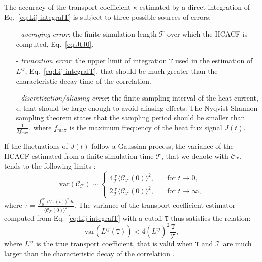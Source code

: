 \begin{LEtext}
The accuracy of the transport coefficient $\kappa$ estimated by a direct integration of Eq.~\eqref{eq:Lij-integralT} is subject to three possible sources of errors:
\begin{itemize}
    \item[-] \emph{averaging error}: the finite simulation length $\mathcal{T}$ over which the HCACF is computed, Eq.~\eqref{eq:JtJ0}.
    \item[-] \emph{truncation error}: the upper limit of integration $\mathtt{T}$ used in the estimation of $L^{ij}$, Eq.~\eqref{eq:Lij-integralT}, that should be much greater than the characteristic decay time of the correlation.
    \item[-] \emph{discretization/aliasing error}: the finite sampling interval of the heat current, $\epsilon$, that should be large enough to avoid aliasing effects. The Nyqvist-Shannon sampling theorem \cite{Oppenheim1999} states that the sampling period should be smaller than $\frac{1}{2f_\mathrm{max}}$, where $f_\mathrm{max}$ is the maximum frequency of the heat flux signal $J(t)$.
\end{itemize}
If the fluctuations of $J(t)$ follow a Gaussian process, the variance of the HCACF estimated from a finite simulation time $\mathcal{T}$, that we denote with $\mathcal{C}_\mathcal{T}$, tends to the following limits \cite{Jones2012}:
\begin{equation}
    \mathrm{var} \left(\mathcal{C}_\mathcal{T}\right) \sim \left\{
    \begin{aligned}
        4 \frac{\tilde\tau}{\mathcal{T}} \langle \mathcal{C}_\mathcal{T}(0) \rangle^2 , \quad &\text{for }t\rightarrow 0 , \\
        2 \frac{\tilde\tau}{\mathcal{T}} \langle \mathcal{C}_\mathcal{T}(0) \rangle^2 , \quad &\text{for }t\rightarrow \infty ,
    \end{aligned} \right.
\end{equation}
where $\tilde\tau = \frac{\int_0^\infty \langle \mathcal{C}_\mathcal{T}(t) \rangle^2 dt}{\langle \mathcal{C}_\mathcal{T}(0) \rangle^2}$. The variance of the transport coefficient estimator computed from Eq.~\eqref{eq:Lij-integralT} with a cutoff $\mathtt{T}$ thus satisfies the relation:
\begin{equation}
    \mathrm{var} \left(L^{ij}(\mathtt{T})\right) < 4 \left(L^{ij}\right)^2 \frac{\mathtt{T}}{\mathcal{T}} ,
\end{equation}
where $L^{ij}$ is the true transport coefficient, that is valid when $\mathtt{T}$ and $\mathcal{T}$ are much larger than the characteristic decay of the correlation \cite{Jones2012}.


\end{LEtext}

